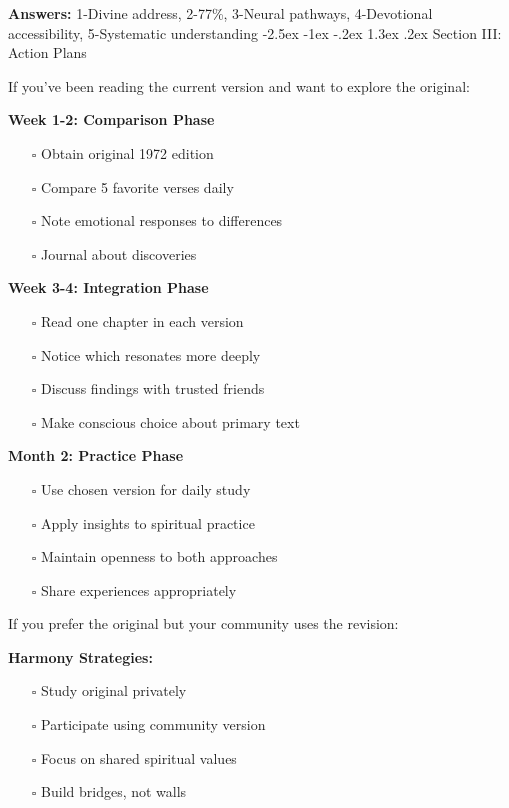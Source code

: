 \documentclass[12pt,twoside]{book}
\makeatletter
\renewcommand\section{\@startsection{section}{1}{\z@}%
{-2.5ex \@plus -1ex \@minus -.2ex}%
{1.3ex \@plus.2ex}%
{\normalfont\Large\bfseries}}
\makeatother
\begin{document}
\textbf{\textbf{Answers:}} 1-Divine address, 2-77\%, 3-Neural pathways, 4-Devotional accessibility, 5-Systematic understanding
\section{Section III: Action Plans}
\label{sec:orgc29e94c}

If you've been reading the current version and want to explore the original:

\textbf{\textbf{Week 1-2: Comparison Phase}}
\begin{itemize}
\item[{$\square$}] Obtain original 1972 edition
\item[{$\square$}] Compare 5 favorite verses daily
\item[{$\square$}] Note emotional responses to differences
\item[{$\square$}] Journal about discoveries
\end{itemize}

\textbf{\textbf{Week 3-4: Integration Phase}}
\begin{itemize}
\item[{$\square$}] Read one chapter in each version
\item[{$\square$}] Notice which resonates more deeply
\item[{$\square$}] Discuss findings with trusted friends
\item[{$\square$}] Make conscious choice about primary text
\end{itemize}

\textbf{\textbf{Month 2: Practice Phase}}
\begin{itemize}
\item[{$\square$}] Use chosen version for daily study
\item[{$\square$}] Apply insights to spiritual practice
\item[{$\square$}] Maintain openness to both approaches
\item[{$\square$}] Share experiences appropriately
\end{itemize}

If you prefer the original but your community uses the revision:

\textbf{\textbf{Harmony Strategies:}}
\begin{itemize}
\item[{$\square$}] Study original privately
\item[{$\square$}] Participate using community version
\item[{$\square$}] Focus on shared spiritual values
\item[{$\square$}] Build bridges, not walls
\end{itemize}
\end{document}
